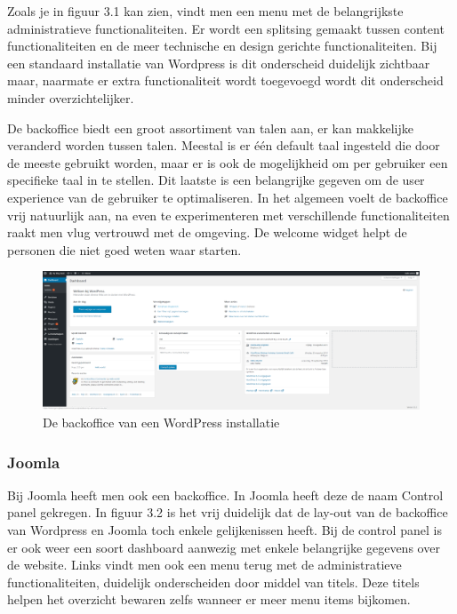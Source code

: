 Zoals je in figuur 3.1 kan zien, vindt men een menu met de belangrijkste administratieve functionaliteiten. Er wordt een splitsing gemaakt tussen content functionaliteiten en de meer technische en design gerichte functionaliteiten. Bij een standaard installatie van Wordpress is dit onderscheid duidelijk zichtbaar maar, naarmate er extra functionaliteit wordt toegevoegd wordt dit onderscheid minder overzichtelijker. 

De backoffice biedt een groot assortiment van talen aan, er kan makkelijke veranderd worden tussen talen. Meestal is er één default taal ingesteld die door de meeste gebruikt worden, maar er is ook de mogelijkheid om per gebruiker een specifieke taal in te stellen. Dit laatste is een belangrijke gegeven om de user experience van de gebruiker te optimaliseren. In het algemeen voelt de backoffice vrij natuurlijk aan, na even te experimenteren met verschillende functionaliteiten raakt men vlug vertrouwd met de omgeving. De welcome widget helpt de personen die niet goed weten waar starten. 
\begin{figure}
    \centering
    \includegraphics[scale = 0.2]{img/Backoffice_WordPpress.png}
    \caption{De backoffice van een WordPress installatie}
    \label{fig:backofficeWP}
\end{figure}
\subsubsection{Joomla}
Bij Joomla heeft men ook een backoffice. In Joomla heeft deze de naam Control panel gekregen. In figuur 3.2 is het vrij duidelijk dat de lay-out van de backoffice van Wordpress en Joomla  toch enkele gelijkenissen heeft. Bij de control panel is er ook weer een soort dashboard aanwezig met enkele belangrijke gegevens over de website. Links vindt men ook een menu terug met de administratieve functionaliteiten, duidelijk onderscheiden door middel van titels. Deze titels helpen het overzicht bewaren zelfs wanneer er meer menu items bijkomen.

